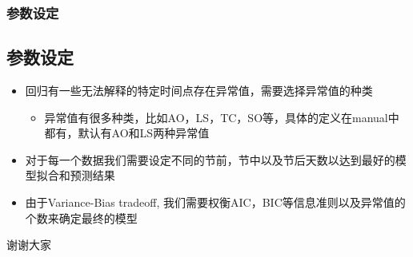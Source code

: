 \documentclass{beamer}
\begin{document}
\begin{frame}
\frametitle{参数设定}
\subsection{参数设定}
\begin{itemize}
\item 回归有一些无法解释的特定时间点存在异常值，需要选择异常值的种类
\begin{itemize}
\item 异常值有很多种类，比如AO，LS，TC，SO等，具体的定义在manual中都有，默认有AO和LS两种异常值
\end{itemize}
\item 对于每一个数据我们需要设定不同的节前，节中以及节后天数以达到最好的模型拟合和预测结果
\item 由于Variance-Bias tradeoff, 我们需要权衡AIC，BIC等信息准则以及异常值的个数来确定最终的模型
\end{itemize}
\end{frame}

\begin{frame}
\Huge{\centerline{谢谢大家}}
\end{frame}

\end{document}
